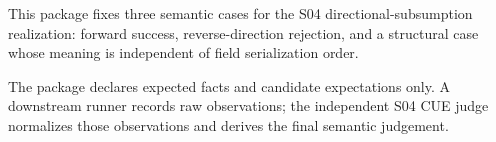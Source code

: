 
This package fixes three semantic cases for the S04 directional-subsumption
realization: forward success, reverse-direction rejection, and a structural
case whose meaning is independent of field serialization order.

The package declares expected facts and candidate expectations only. A
downstream runner records raw observations; the independent S04 CUE judge
normalizes those observations and derives the final semantic judgement.
